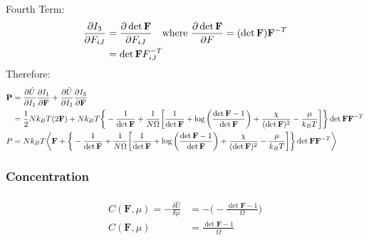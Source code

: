 \documentclass[12pt,3p]{article}
\numberwithin{equation}{section}
\begin{document}
Fourth Term: 
\begin{align*}
\pdv{I_3}{F_{iJ}} &= \pdv{\det \mathbf{F}}{F_{iJ}} \quad \text{where } \pdv{\det \mathbf{F}}{F} = (\det \mathbf{F}) \mathbf{F}^{-T} \\
			&= \det \mathbf{F} F_{iJ}^{-T}
\end{align*}
Therefore: 
\begin{align*}
\mathbf{P} &= \pdv{\hat{U}}{I_1} \pdv{I_1}{\mathbf{F}} + \pdv{\hat{U}}{I_3} \pdv{I_3}{\mathbf{F}} \\
	  &= \frac{1}{2} N k_B T (2 \mathbf{F}) + N k_B T \bigg\{- \frac{1}{\det \mathbf{F}} + \frac{1}{N \Omega} \bigg[ \frac{1}{\det \mathbf{F}} + \log \bigg( \frac{\det \mathbf{F} - 1}{\det \mathbf{F}} \bigg) + \frac{\chi}{(\det \mathbf{F})^2} - \frac{\mu}{k_B T} \bigg] \bigg\} \det \mathbf{F} \mathbf{F}^{-T} \\
P &= N k_B T \bigg \langle \mathbf{F} + \bigg\{- \frac{1}{\det \mathbf{F}} + \frac{1}{N \Omega} \bigg[ \frac{1}{\det \mathbf{F}} + \log \bigg( \frac{\det \mathbf{F} - 1}{\det \mathbf{F}} \bigg) + \frac{\chi}{(\det \mathbf{F})^2} - \frac{\mu}{k_B T} \bigg] \bigg\} \det \mathbf{F} \mathbf{F}^{-T} \bigg \rangle
\end{align*}
\subsubsection{Concentration}
\begin{align}\label{Concentration}
\begin{split}
C (\mathbf{F}, \mu) = - \frac{\delta \hat{U}}{\delta \mu} &= - \bigg( - \frac{\det \mathbf{F} - 1}{\Omega} \bigg) \\
						C (\mathbf{F}, \mu) &= \frac{\det \mathbf{F} - 1}{\Omega}
\end{split}
\end{align}

\end{document}
